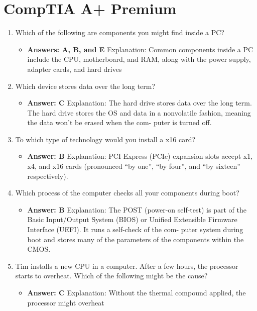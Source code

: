 \documentclass{article}
\begin{document}
\section{CompTIA A+ Premium} 
\begin{enumerate}
    \item Which of the following are components you might find inside a PC? 
    \begin{itemize}
        \item \textbf{Answers: A, B, and E}
Explanation: Common components inside a PC include the CPU, motherboard, and
RAM, along with the power supply, adapter cards, and hard drives
    \end{itemize}
    \item Which device stores data over the long term? 
    \begin{itemize}
        \item \textbf{Answer: C}
Explanation: The hard drive stores data over the long term. The hard drive stores the
OS and data in a nonvolatile fashion, meaning the data won’t be erased when the com-
puter is turned off.
    \end{itemize}
    \item To which type of technology would you install a x16 card?
    \begin{itemize}
        \item \textbf{Answer: B } Explanation: PCI Express (PCIe) expansion slots accept x1, x4, and x16 cards
(pronounced “by one”, “by four”, and “by sixteen” respectively).
    \end{itemize}
    \item Which process of the computer checks all your components
during boot?
    \begin{itemize}
        \item \textbf{Answer: B}
Explanation: The POST (power-on self-test) is part of the Basic Input/Output System
(BIOS) or Unified Extensible Firmware Interface (UEFI). It runs a self-check of the com-
puter system during boot and stores many of the parameters of the components within
the CMOS.
    \end{itemize}
    \item Tim installs a new CPU in a computer. After a few hours, the
processor starts to overheat. Which of the following might be the
cause?
    \begin{itemize}
        \item \textbf{Answer: C}
Explanation: Without the thermal compound applied, the processor might overheat

\end{itemize}
\end{enumerate}
\end{document}
